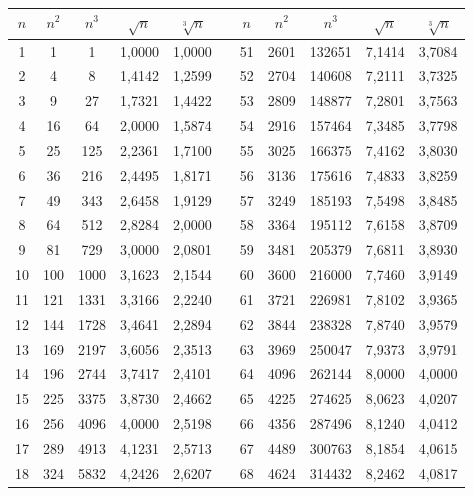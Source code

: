 \documentclass[a4paper,oneside]{book}%
\author{claudio duchi}
\begin{document}
	\begin{longtable}{S@{\hspace{1cm}}S@{\hspace{1cm}}S@{\hspace{1cm}}S@{\hspace{1cm}}S@{\hspace{1cm}}S@{\hspace{1cm}}S@{\hspace{1cm}}S@{\hspace{1cm}}S@{\hspace{1cm}}S@{\hspace{1cm}}S} 
		\toprule
		\bfseries {$n$} &  {$n^2$} & {$n^3$}&{$\sqrt{n}$}&{$\sqrt[3]{n}$}&{ }&{$n$} &  {$n^2$} & {$n^3$}&{$\sqrt{n}$}&{$\sqrt[3]{n}$}  \\
		\midrule \endhead
		\bottomrule \endfoot{}
		1&1&1&1,0000&1,0000&&51&2601&132651&7,1414&3,7084\\
		2&4&8&1,4142&1,2599&&52&2704&140608&7,2111&3,7325\\
		3&9&27&1,7321&1,4422&&53&2809&148877&7,2801&3,7563\\
		4&16&64&2,0000&1,5874&&54&2916&157464&7,3485&3,7798\\
		5&25&125&2,2361&1,7100&&55&3025&166375&7,4162&3,8030\\
		6&36&216&2,4495&1,8171&&56&3136&175616&7,4833&3,8259\\
		7&49&343&2,6458&1,9129&&57&3249&185193&7,5498&3,8485\\
		8&64&512&2,8284&2,0000&&58&3364&195112&7,6158&3,8709\\
		9&81&729&3,0000&2,0801&&59&3481&205379&7,6811&3,8930\\
		10&100&1000&3,1623&2,1544&&60&3600&216000&7,7460&3,9149\\
		11&121&1331&3,3166&2,2240&&61&3721&226981&7,8102&3,9365\\
		12&144&1728&3,4641&2,2894&&62&3844&238328&7,8740&3,9579\\
		13&169&2197&3,6056&2,3513&&63&3969&250047&7,9373&3,9791\\
		14&196&2744&3,7417&2,4101&&64&4096&262144&8,0000&4,0000\\
		15&225&3375&3,8730&2,4662&&65&4225&274625&8,0623&4,0207\\
		16&256&4096&4,0000&2,5198&&66&4356&287496&8,1240&4,0412\\
		17&289&4913&4,1231&2,5713&&67&4489&300763&8,1854&4,0615\\
		18&324&5832&4,2426&2,6207&&68&4624&314432&8,2462&4,0817\\

\end{longtable}
\end{document}
